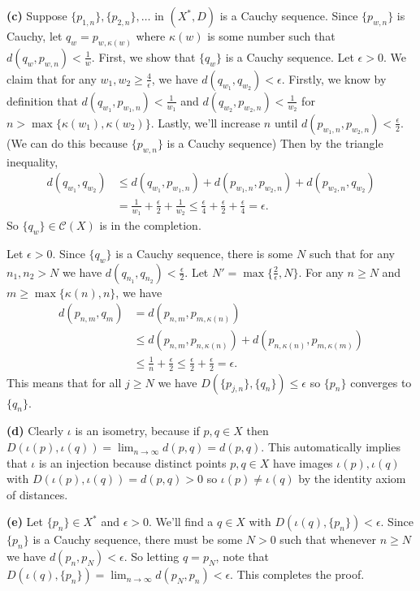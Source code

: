 \documentclass[11pt,letterpaper]{article}
\begin{document}
\begin{solution}
    \textbf{(c)} Suppose $\{p_{1,n}\},\{p_{2,n}\},\ldots$ in $(X^*, D)$ is a Cauchy sequence. Since $\{p_{w,n}\}$ is Cauchy, let $q_w=p_{w,\kappa(w)}$ where $\kappa(w)$ is some number such that $d(q_w, p_{w,n})<\frac{1}{w}$. First, we show that $\{q_w\}$ is a Cauchy sequence. Let $\epsilon>0$. We claim that for any $w_1,w_2\geq \frac{4}{\epsilon}$, we have $d(q_{w_1}, q_{w_2})<\epsilon$. Firstly, we know by definition that $d(q_{w_1}, p_{w_1,n})<\frac{1}{w_1}$ and $d(q_{w_2}, p_{w_2,n})<\frac{1}{w_2}$ for $n>\max\{\kappa(w_1), \kappa(w_2)\}$. Lastly, we'll increase $n$ until $d(p_{w_1,n}, p_{w_2,n})<\frac{\epsilon}{2}$. (We can do this because $\{p_{w,n}\}$ is  a Cauchy sequence) Then by the triangle inequality,
    \[
        \begin{aligned}
            d(q_{w_1}, q_{w_2})&\leq d(q_{w_1}, p_{w_1,n})+d(p_{w_1,n}, p_{w_2,n})+d(p_{w_2, n}, q_{w_2})\\
            &=\frac{1}{w_1}+\frac{\epsilon}{2}+\frac{1}{w_2}\leq \frac{\epsilon}{4}+\frac{\epsilon}{2}+\frac{\epsilon}{4}=\epsilon.
        \end{aligned}
    \]         
    So $\{q_w\}\in \mathcal{C}(X)$ is in the completion. 
    
    Let $\epsilon>0$. Since $\{q_w\}$ is a Cauchy sequence, there is some $N$ such that for any $n_1,n_2>N$ we have $d(q_{n_1}, q_{n_2})<\frac{\epsilon}{2}$. Let $N'=\max\{\frac{2}{\epsilon}, N\}$. For any $n\geq N$ and $m\geq \max\{\kappa(n),n\}$, we have
    \[
        \begin{aligned}
            d(p_{n,m}, q_m) &= d(p_{n,m}, p_{m,\kappa(n)})\\
            &\leq d(p_{n,m}, p_{n,\kappa(n)})+d(p_{n,\kappa(n)}, p_{m,\kappa(m)})\\
            &\leq \frac{1}{n} + \frac{\epsilon}{2}\leq \frac{\epsilon}{2}+\frac{\epsilon}{2}=\epsilon.
        \end{aligned}
    \]     
    This means that for all $j\geq N$ we have $D(\{p_{j,n}\},\{q_n\})\leq \epsilon$ so $\{p_n\}$ converges to $\{q_n\}$. 

    \textbf{(d)} Clearly $\iota$ is an isometry, because if $p,q\in X$ then $D(\iota(p),\iota(q))=\lim_{n\to \infty}d(p,q)=d(p,q)$. This automatically implies that $\iota$ is an injection because distinct points $p,q\in X$ have images $\iota(p),\iota(q)$ with $D(\iota(p),\iota(q))=d(p,q)>0$ so $\iota(p)\neq \iota(q)$ by the identity axiom of distances.
    
    \textbf{(e)} Let $\{p_n\}\in X^*$ and $\epsilon >0$. We'll find a $q\in X$ with $D(\iota(q), \{p_n\})<\epsilon$. Since $\{p_n\}$ is a Cauchy sequence, there must be some $N>0$ such that whenever $n\geq N$ we have $d(p_n, p_N)<\epsilon$. So letting $q=p_N$, note that $D(\iota(q), \{p_n\})=\lim_{n\to\infty} d(p_N,p_n)<\epsilon$. This completes the proof.  
\end{solution}
\end{document}
